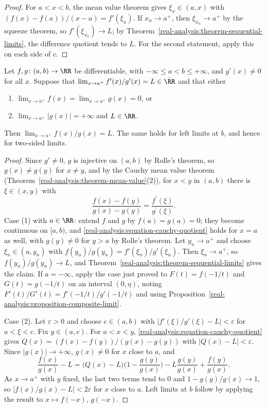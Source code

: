 \begin{proof}
For $a < x < b$, the mean value theorem gives $\xi_x \in (a, x)$ with $(f(x) - f(a))/(x - a) = f'(\xi_x)$. If $x_n \to a^+$, then $\xi_{x_n} \to a^+$ by the squeeze theorem, so $f'(\xi_{x_n}) \to L$; by
Theorem~\ref{real-analysis:theorem-sequential-limits}, the difference quotient tends to $L$. For the second statement, apply this on each side of $c$.
\end{proof}

\begin{theorem}[de l'H\^opital]\label{real-analysis:theorem-lhopital}
Let $f, g \colon (a, b) \to \RR$ be differentiable, with $-\infty \leq a < b \leq +\infty$, and $g'(x) \neq 0$ for all $x$. Suppose that $\lim_{x \to a^+}f'(x)/g'(x) = L \in \bar{\RR}$ and that either
\begin{enumerate}
\item $\lim_{x \to a^+}f(x) = \lim_{x \to a^+}g(x) = 0$, or
\item $\lim_{x \to a^+}|g(x)| = +\infty$ and $L \in \RR$.
\end{enumerate}
Then $\lim_{x \to a^+}f(x)/g(x) = L$. The same holds for left limits at $b$, and hence for two-sided limits.
\end{theorem}

\begin{proof}
Since $g' \neq 0$, $g$ is injective on $(a, b)$ by Rolle's theorem, so $g(x) \neq g(y)$ for $x \neq y$, and by the Cauchy mean value theorem (Theorem~\ref{real-analysis:theorem-mean-value}(2)), for $x < y$ in $(a, b)$ there is
$\xi \in (x, y)$ with
\begin{equation}\label{real-analysis:equation-cauchy-quotient}
\frac{f(x) - f(y)}{g(x) - g(y)} = \frac{f^{\prime}(\xi)}{g^{\prime}(\xi)}.
\end{equation}
Case (1) with $a \in \RR$: extend $f$ and $g$ by $f(a) = g(a) = 0$; they become continuous on $[a, b)$, and \eqref{real-analysis:equation-cauchy-quotient} holds for $x = a$ as well, with $g(y) \neq 0$ for $y > a$ by Rolle's theorem. Let $y_n \to a^+$ and choose
$\xi_n \in (a, y_n)$ with $f(y_n)/g(y_n) = f'(\xi_n)/g'(\xi_n)$. Then $\xi_n \to a^+$, so $f(y_n)/g(y_n) \to L$, and Theorem~\ref{real-analysis:theorem-sequential-limits} gives the claim. If $a = -\infty$, apply the case just
proved to $F(t) = f(-1/t)$ and $G(t) = g(-1/t)$ on an interval $(0, \eta)$, noting $F'(t)/G'(t) = f'(-1/t)/g'(-1/t)$ and using Proposition~\ref{real-analysis:proposition-composite-limit}.

Case (2). Let $\varepsilon > 0$ and choose $c \in (a, b)$ with $|f'(\xi)/g'(\xi) - L| < \varepsilon$ for $a < \xi < c$. Fix $y \in (a, c)$. For $a < x < y$, \eqref{real-analysis:equation-cauchy-quotient} gives $Q(x) = (f(x) - f(y))/(g(x) - g(y))$ with $|Q(x) - L| < \varepsilon$. Since
$|g(x)| \to +\infty$, $g(x) \neq 0$ for $x$ close to $a$, and
\[
\frac{f(x)}{g(x)} - L = \big(Q(x) - L\big)\Big(1 - \frac{g(y)}{g(x)}\Big) - L\frac{g(y)}{g(x)} + \frac{f(y)}{g(x)}.
\]
As $x \to a^+$ with $y$ fixed, the last two terms tend to $0$ and $1 - g(y)/g(x) \to 1$, so $|f(x)/g(x) - L| < 2\varepsilon$ for $x$ close to $a$. Left limits at $b$ follow by applying the result to $x \mapsto f(-x)$, $g(-x)$.
\end{proof}

